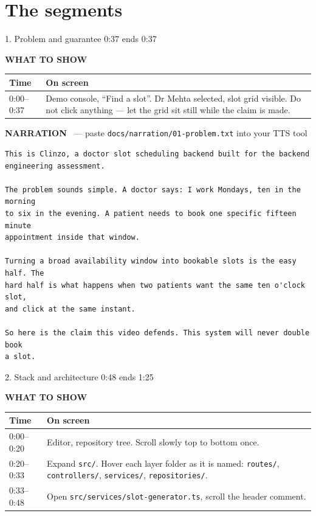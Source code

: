 \documentclass[11pt,a4paper]{article}
\newcommand{\segbar}[3]{%
  \vspace{12pt}
  \noindent\colorbox{accent}{\parbox{\dimexpr\textwidth-2\fboxsep}{%
    \color{white}\bfseries\large\strut #1 \hfill \normalsize #2 \quad ends #3}}
  \par\vspace{7pt}}
\newcommand{\showhdr}{\noindent\textcolor{showc}{\textbf{WHAT TO SHOW}}\par\vspace{2pt}}
\newcommand{\voicehdr}[1]{\vspace{4pt}\noindent\textcolor{voice}{\textbf{NARRATION}}%
  \ \textcolor{soft}{\small --- paste \texttt{docs/narration/#1.txt} into your TTS tool}\par\vspace{2pt}}
\begin{document}
\section{The segments}

\segbar{1. Problem and guarantee}{0:37}{0:37}

\showhdr
\begin{longtable}{@{}p{1.6cm} p{13.4cm}@{}}
\toprule
\textbf{Time} & \textbf{On screen} \\
\midrule
\endhead
0:00--0:37 & Demo console, ``Find a slot''. Dr Mehta selected, slot grid visible.
             Do not click anything --- let the grid sit still while the claim is made. \\
\bottomrule
\end{longtable}

\voicehdr{01-problem}
\begin{lstlisting}[style=tts]
This is Clinzo, a doctor slot scheduling backend built for the backend
engineering assessment.

The problem sounds simple. A doctor says: I work Mondays, ten in the morning
to six in the evening. A patient needs to book one specific fifteen minute
appointment inside that window.

Turning a broad availability window into bookable slots is the easy half. The
hard half is what happens when two patients want the same ten o'clock slot,
and click at the same instant.

So here is the claim this video defends. This system will never double book
a slot.
\end{lstlisting}

\segbar{2. Stack and architecture}{0:48}{1:25}

\showhdr
\begin{longtable}{@{}p{1.6cm} p{13.4cm}@{}}
\toprule
\textbf{Time} & \textbf{On screen} \\
\midrule
\endhead
0:00--0:20 & Editor, repository tree. Scroll slowly top to bottom once. \\
0:20--0:33 & Expand \texttt{src/}. Hover each layer folder as it is named:
             \texttt{routes/}, \texttt{controllers/}, \texttt{services/},
             \texttt{repositories/}. \\
0:33--0:48 & Open \texttt{src/services/slot-generator.ts}, scroll the header comment. \\
\bottomrule
\end{longtable}
\end{document}
